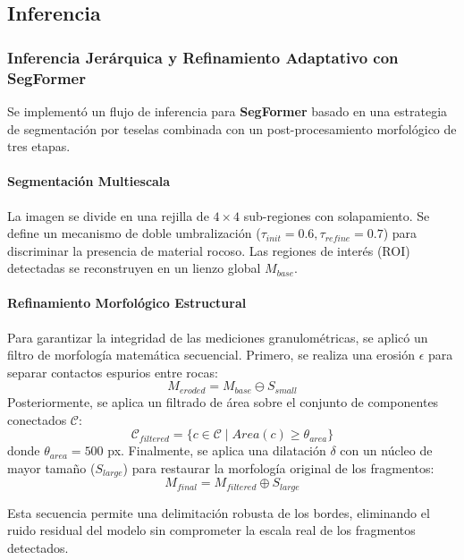 \subsection{Inferencia}

\subsubsection{Inferencia Jerárquica y Refinamiento Adaptativo con SegFormer}

Se implementó un flujo de inferencia para \textbf{SegFormer} basado en una estrategia de segmentación por teselas combinada con un post-procesamiento morfológico de tres etapas.

\paragraph{Segmentación Multiescala}
La imagen se divide en una rejilla de $4 \times 4$ sub-regiones con solapamiento. Se define un mecanismo de doble umbralización ($\tau_{init}=0.6, \tau_{refine}=0.7$) para discriminar la presencia de material rocoso. Las regiones de interés (ROI) detectadas se reconstruyen en un lienzo global $M_{base}$.

\paragraph{Refinamiento Morfológico Estructural}
Para garantizar la integridad de las mediciones granulométricas, se aplicó un filtro de morfología matemática secuencial. Primero, se realiza una erosión $\epsilon$ para separar contactos espurios entre rocas:
\begin{equation}
	M_{eroded} = M_{base} \ominus S_{small}
\end{equation}
Posteriormente, se aplica un filtrado de área sobre el conjunto de componentes conectados $\mathcal{C}$:
\begin{equation}
	\mathcal{C}_{filtered} = \{ c \in \mathcal{C} \mid Area(c) \geq \theta_{area} \}
\end{equation}
donde $\theta_{area} = 500$ px. Finalmente, se aplica una dilatación $\delta$ con un núcleo de mayor tamaño ($S_{large}$) para restaurar la morfología original de los fragmentos:
\begin{equation}
	M_{final} = M_{filtered} \oplus S_{large}
\end{equation}

Esta secuencia permite una delimitación robusta de los bordes, eliminando el ruido residual del modelo sin comprometer la escala real de los fragmentos detectados.

